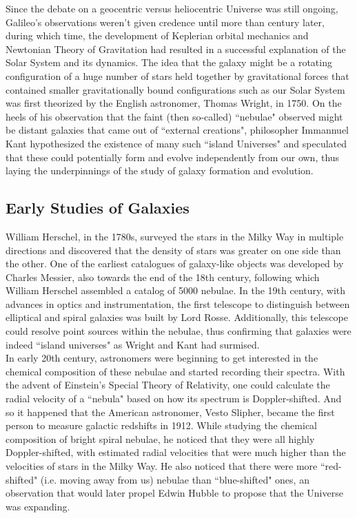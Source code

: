 Since the debate on a geocentric versus heliocentric Universe was still ongoing, Galileo's observations weren't given credence until more than century later, during which time, the development of Keplerian orbital mechanics and Newtonian Theory of Gravitation had resulted in a successful explanation of the Solar System and its dynamics. The idea that the galaxy might be a rotating configuration of a huge number of stars held together by gravitational forces that contained smaller gravitationally bound configurations such as our Solar System was first theorized by the English astronomer, Thomas Wright, in 1750. On the heels of his observation that the faint (then so-called) ``nebulae" observed might be distant galaxies that came out of ``external creations", philosopher Immannuel Kant hypothesized the existence of many such ``island Universes" and speculated that these could potentially form and evolve independently from our own, thus laying the underpinnings of the study of galaxy formation and evolution.\\

\subsection{Early Studies of Galaxies}

William Herschel, in the 1780s, surveyed the stars in the Milky Way in multiple directions and discovered that the density of stars was greater on one side than the other. One of the earliest catalogues of galaxy-like objects was developed by Charles Messier, also towards the end of the 18th century, following which William Herschel assembled a catalog of 5000 nebulae. In the 19th century, with advances in optics and instrumentation, the first telescope to distinguish between elliptical and spiral galaxies was built by Lord Rosse. Additionally, this telescope could resolve point sources within the nebulae, thus confirming that galaxies were indeed ``island universes" as Wright and Kant had surmised.\\

In early 20th century, astronomers were beginning to get interested in the chemical composition of these nebulae and started recording their spectra. With the advent of Einstein's Special Theory of Relativity, one could calculate the radial velocity of a ``nebula" based on how its spectrum is Doppler-shifted. And so it happened that the American astronomer, Vesto Slipher, became the first person to measure galactic redshifts in 1912. While studying the chemical composition of bright spiral nebulae, he noticed that they were all highly Doppler-shifted, with estimated radial velocities that were much higher than the velocities of stars in the Milky Way. He also noticed that there were more ``red-shifted" (i.e. moving away from us) nebulae than ``blue-shifted" ones, an observation that would later propel Edwin Hubble to propose that the Universe was expanding.\\

